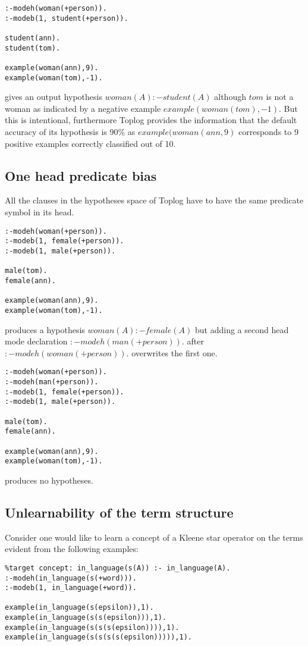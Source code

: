 \begin{lstlisting}
:-modeh(woman(+person)).
:-modeb(1, student(+person)).

student(ann).
student(tom).

example(woman(ann),9).
example(woman(tom),-1).
\end{lstlisting}

gives an output hypothesis $woman(A) :- student(A)$ although $tom$ is not a woman as indicated by a negative example $example(woman(tom),-1)$.
But this is intentional, furthermore Toplog provides the information that the default accuracy of its hypothesis is 90\% as $example(woman(ann,9)$ corresponds to 9 positive examples correctly classified out of 10.

\subsection{One head predicate bias}
All the clauses in the hypotheses space of Toplog have to have the same predicate symbol in its head.

\begin{lstlisting}
:-modeh(woman(+person)).
:-modeb(1, female(+person)).
:-modeb(1, male(+person)).

male(tom).
female(ann).

example(woman(ann),9).
example(woman(tom),-1).
\end{lstlisting}
produces a hypothesis $woman(A) :- female(A)$ but adding a second
head mode declaration $:-modeh(man(+person)).$ after $:-modeh(woman(+person)).$ overwrites the first one.

\begin{lstlisting}
:-modeh(woman(+person)).
:-modeh(man(+person)).
:-modeb(1, female(+person)).
:-modeb(1, male(+person)).

male(tom).
female(ann).

example(woman(ann),9).
example(woman(tom),-1).
\end{lstlisting}
produces no hypotheses.

\subsection{Unlearnability of the term structure}
Consider one would like to learn a concept of a Kleene star operator on the terms evident from the following examples:
\begin{lstlisting}
%target concept: in_language(s(A)) :- in_language(A).
:-modeh(in_language(s(+word))).
:-modeb(1, in_language(+word)).

example(in_language(s(epsilon)),1).
example(in_language(s(s(epsilon))),1).
example(in_language(s(s(s(epsilon)))),1).
example(in_language(s(s(s(s(epsilon))))),1).
\end{lstlisting}

